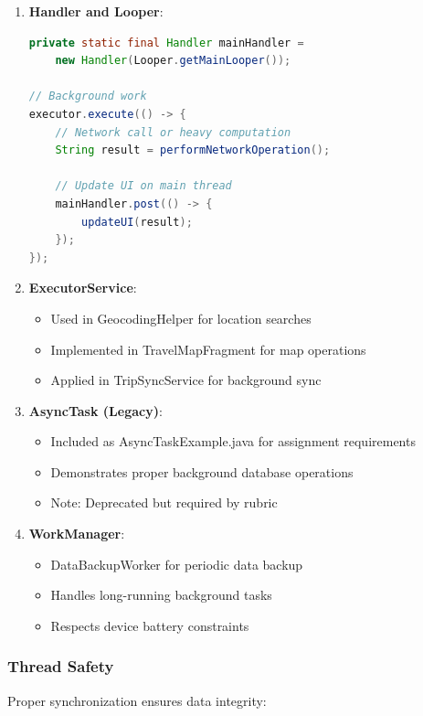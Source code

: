 \documentclass[12pt,a4paper]{article}
\begin{document}
\begin{enumerate}
    \item \textbf{Handler and Looper}:
    \begin{lstlisting}[language=Java, caption=Handler for UI Updates]
private static final Handler mainHandler =
    new Handler(Looper.getMainLooper());

// Background work
executor.execute(() -> {
    // Network call or heavy computation
    String result = performNetworkOperation();

    // Update UI on main thread
    mainHandler.post(() -> {
        updateUI(result);
    });
});
    \end{lstlisting}

    \item \textbf{ExecutorService}:
    \begin{itemize}
        \item Used in GeocodingHelper for location searches
        \item Implemented in TravelMapFragment for map operations
        \item Applied in TripSyncService for background sync
    \end{itemize}

    \item \textbf{AsyncTask (Legacy)}:
    \begin{itemize}
        \item Included as AsyncTaskExample.java for assignment requirements
        \item Demonstrates proper background database operations
        \item Note: Deprecated but required by rubric
    \end{itemize}

    \item \textbf{WorkManager}:
    \begin{itemize}
        \item DataBackupWorker for periodic data backup
        \item Handles long-running background tasks
        \item Respects device battery constraints
    \end{itemize}
\end{enumerate}

\subsubsection{Thread Safety}
Proper synchronization ensures data integrity:
\end{document}
